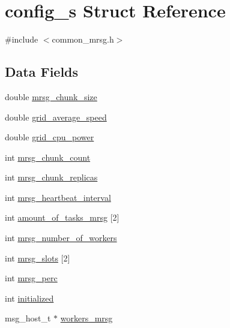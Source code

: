\hypertarget{structconfig__s}{\section{config\-\_\-s \-Struct \-Reference}
\label{structconfig__s}
}


{\ttfamily \#include $<$common\-\_\-mrsg.\-h$>$}

\subsection*{\-Data \-Fields}
\begin{DoxyCompactItemize}
\item 
double \hyperlink{structconfig__s_a772fffbb432f9a98f427f2abaa1d66b5}{mrsg\-\_\-chunk\-\_\-size}
\item 
double \hyperlink{structconfig__s_a6bc024fc05bd7ee560aa58399e4ed39b}{grid\-\_\-average\-\_\-speed}
\item 
double \hyperlink{structconfig__s_a907f6cdbc6d12af5e2eaacc353c88873}{grid\-\_\-cpu\-\_\-power}
\item 
int \hyperlink{structconfig__s_ac7cd0ad58e543242a5fab3407d9a7321}{mrsg\-\_\-chunk\-\_\-count}
\item 
int \hyperlink{structconfig__s_a9d9be2b521e73c6930b34c10c635452f}{mrsg\-\_\-chunk\-\_\-replicas}
\item 
int \hyperlink{structconfig__s_a8e64f8572791c98131a0e92a7309ec63}{mrsg\-\_\-heartbeat\-\_\-interval}
\item 
int \hyperlink{structconfig__s_a119fab03303982f1b583a79b6c09e907}{amount\-\_\-of\-\_\-tasks\-\_\-mrsg} \mbox{[}2\mbox{]}
\item 
int \hyperlink{structconfig__s_a97bc00c20af06daa1ba97b7dd9043119}{mrsg\-\_\-number\-\_\-of\-\_\-workers}
\item 
int \hyperlink{structconfig__s_a8ad677d8e20974b7f1cfcef8289a92e9}{mrsg\-\_\-slots} \mbox{[}2\mbox{]}
\item 
int \hyperlink{structconfig__s_a2bdf7b26b9db34b771a4df64a3cd98a2}{mrsg\-\_\-perc}
\item 
int \hyperlink{structconfig__s_a0c33578ad98e034d6ef2fa0563f64a10}{initialized}
\item 
msg\-\_\-host\-\_\-t $\ast$ \hyperlink{structconfig__s_adcea05f854b217e1d32d9901c57254d4}{workers\-\_\-mrsg}
\end{DoxyCompactItemize}


